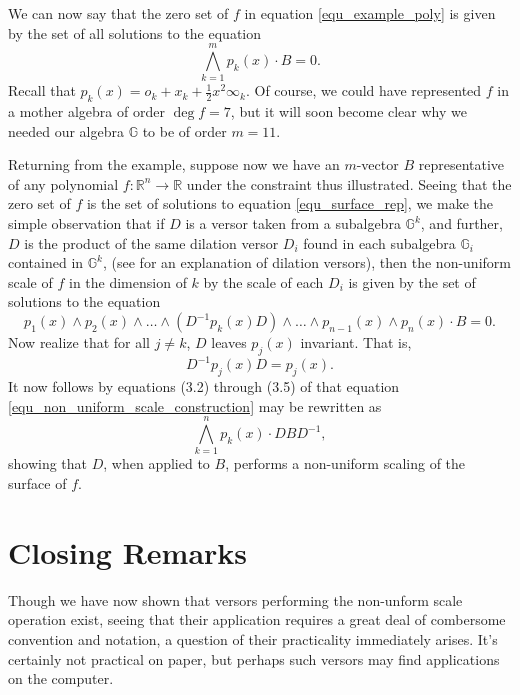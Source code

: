 \documentclass{birkjour}
\theoremstyle{definition}
\theoremstyle{remark}
\numberwithin{equation}{section}
\newcommand{\R}{\mathbb{R}}
\newcommand{\G}{\mathbb{G}}
\newcommand{\nvai}{\infty}
\newcommand{\nvao}{o}
\begin{document}
We can now say that the zero set of $f$ in equation \eqref{equ_example_poly}
is given by the set of all solutions to the equation
\begin{equation}\label{equ_surface_rep}
\bigwedge_{k=1}^m p_k(x)\cdot B = 0.
\end{equation}
Recall that $p_k(x)=\nvao_k+x_k+\frac{1}{2}x^2\nvai_k$.
Of course, we could have represented $f$ in a mother algebra of order $\deg f=7$,
but it will soon become clear why we needed our algebra $\G$ to be of order $m=11$.

Returning from the example, suppose now we have an $m$-vector $B$ representative
of any polynomial $f:\R^n\to\R$ under the constraint thus illustrated.  Seeing that
the zero set of $f$ is the set of solutions to equation \eqref{equ_surface_rep},
we make the simple observation that if $D$ is a versor taken from a subalgebra $\G^k$,
and further, $D$ is the product of the same dilation versor $D_i$ found in each subalgebra
$\G_i$ contained in $\G^k$, (see \cite{Dorst07} for an explanation of dilation versors),
then the non-uniform scale of $f$ in the dimension of $k$ by the scale of each
$D_i$ is given by the set of solutions to the equation
\begin{equation}\label{equ_non_uniform_scale_construction}
p_1(x)\wedge p_2(x)\wedge\dots\wedge (D^{-1}p_k(x)D)\wedge\dots\wedge p_{n-1}(x)\wedge p_n(x)\cdot B=0.
\end{equation}
Now realize that for all $j\neq k$, $D$ leaves $p_j(x)$ invariant.  That is,
\begin{equation*}
D^{-1}p_j(x)D=p_j(x).
\end{equation*}
It now follows by equations (3.2) through (3.5) of \cite{Parkin13} that equation \eqref{equ_non_uniform_scale_construction}
may be rewritten as
\begin{equation*}
\bigwedge_{k=1}^n p_k(x)\cdot DBD^{-1},
\end{equation*}
showing that $D$, when applied to $B$, performs a non-uniform scaling of the surface of $f$.

\section{Closing Remarks}

Though we have now shown that versors performing the non-unform scale operation
exist, seeing that their application requires a great deal of combersome convention and notation,
a question of their practicality immediately arises.  It's certainly not practical on paper, but
perhaps such versors may find applications on the computer.
\end{document}
